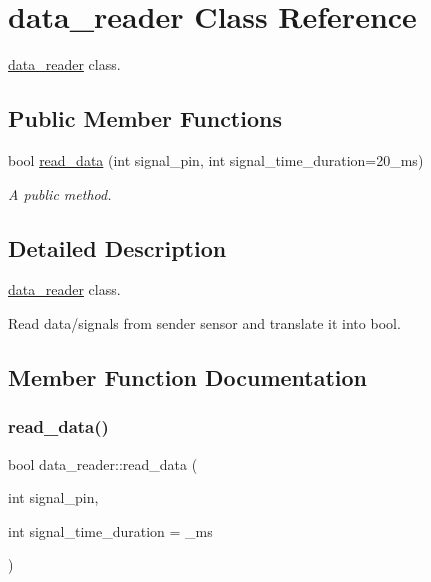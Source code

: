 \hypertarget{classdata__reader}{}\section{data\+\_\+reader Class Reference}
\label{classdata__reader}


\hyperlink{classdata__reader}{data\+\_\+reader} class.  


\subsection*{Public Member Functions}
\begin{DoxyCompactItemize}
\item 
bool \hyperlink{classdata__reader_af1aa94e5e0caa24678f30595a00ad596}{read\+\_\+data} (int signal\+\_\+pin, int signal\+\_\+time\+\_\+duration=20\+\_\+ms)
\begin{DoxyCompactList}\small\item\em A public method. \end{DoxyCompactList}\end{DoxyCompactItemize}


\subsection{Detailed Description}
\hyperlink{classdata__reader}{data\+\_\+reader} class. 

Read data/signals from sender sensor and translate it into bool. 

\subsection{Member Function Documentation}
\mbox{\label{classdata__reader_af1aa94e5e0caa24678f30595a00ad596}} 
\subsubsection{\texorpdfstring{read\+\_\+data()}{read\_data()}}
{\footnotesize\ttfamily bool data\+\_\+reader\+::read\+\_\+data (\begin{DoxyParamCaption}\item[{int}]{signal\+\_\+pin,  }\item[{int}]{signal\+\_\+time\+\_\+duration = {\+\_\+ms} }\end{DoxyParamCaption})\hspace{0.3cm}{\ttfamily [inline]}}



